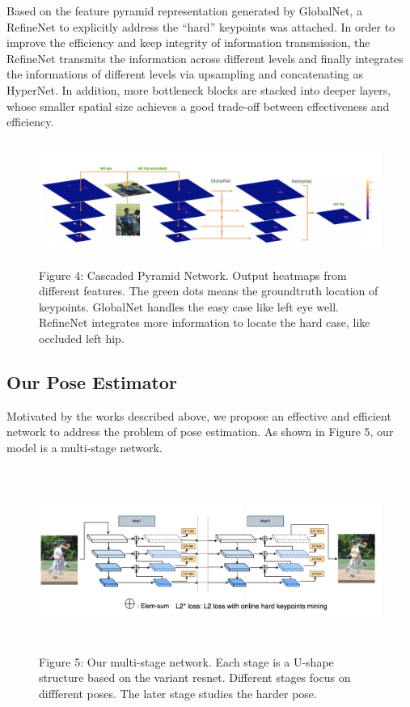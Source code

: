 Based on the feature pyramid representation generated by GlobalNet, a RefineNet to explicitly address the
“hard” keypoints was attached.
In order to improve the efficiency and keep integrity of information transmission,
the RefineNet transmits the information across different levels and finally integrates the informations of different levels via upsampling
and concatenating as HyperNet\cite{kong2016hypernet}. In addition, more bottleneck blocks are stacked into deeper layers,
whose smaller spatial size achieves a good trade-off between effectiveness and efficiency.

\captionsetup[figure]{labelformat=empty}
\begin{figure}[htbp]
  \centering
  \includegraphics[width=16cm,height=4cm]{source/cpn.png}
  \caption{Figure 4: Cascaded Pyramid Network. Output heatmaps from different features. The green dots means the groundtruth location of keypoints.
  GlobalNet handles the easy case like left eye well.
  RefineNet integrates more information to locate the hard case, like occluded left hip.}
\end{figure}

\subsection{Our Pose Estimator}
Motivated by the works\cite{newell2016stacked, chen2017cascaded} described above, we propose an effective and efficient network to address the problem of pose estimation.
As shown in Figure 5, our model is a multi-stage network.

\captionsetup[figure]{labelformat=empty}
\begin{figure}[htbp]
  \centering
  \includegraphics[width=16cm,height=6cm]{source/multi-stage.png}
  \caption{Figure 5: Our multi-stage network. Each stage is a U-shape structure based on the variant resnet.
  Different stages focus on diffferent poses. The later stage studies the harder pose.}
\end{figure}

